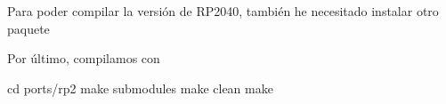 Para poder compilar la versión de RP2040, también he necesitado instalar otro paquete \newline
{} \newline

\newpage
Por último, compilamos con 
\begin{multicli}
  \cliarrow cd ports/rp2 \newline
  \cliarrow make submodules \newline
  \cliarrow make clean \newline
  \cliarrow make
\end{multicli}
